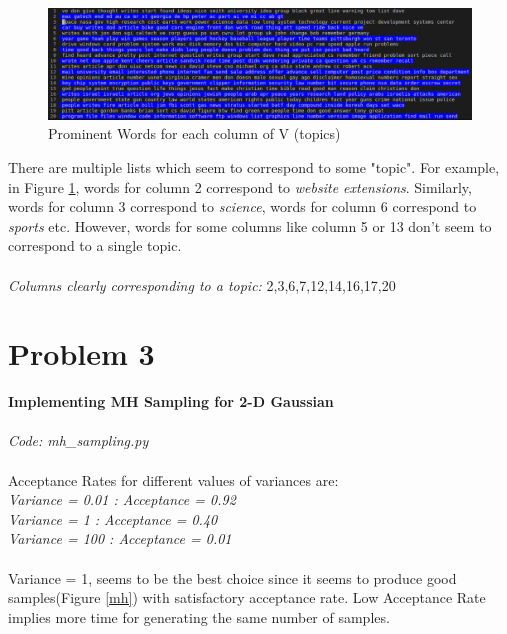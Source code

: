 \documentclass{article}
\begin{document}
\begin{figure}[h!]
\begin{center}
\includegraphics[scale=0.45]{topics.png}
\caption{Prominent Words for each column of V (topics)}
\label{topics}
\end{center}
\end{figure}

There are multiple lists which seem to correspond to some "topic". For example, in Figure \ref{topics}, words for column 2 correspond to \emph{website extensions}. Similarly, words for column 3 correspond to \emph{science}, words for column 6 correspond to \emph{sports} etc. However, words for some columns like column 5 or 13 don't seem to correspond to a single topic. \\ \\
\emph{Columns clearly corresponding to a topic: } 2,3,6,7,12,14,16,17,20

\section*{Problem 3}
\textbf{Implementing MH Sampling for 2-D Gaussian} \\ \\
\emph{Code: mh\_sampling.py} \\ \\
Acceptance Rates for different values of variances are: \\
\emph{Variance = 0.01 : Acceptance = 0.92} \\
\emph{Variance = 1 : Acceptance = 0.40}\\
\emph{Variance = 100 : Acceptance = 0.01} \\ \\
Variance = 1, seems to be the best choice since it seems to produce good samples(Figure \ref{mh}) with satisfactory acceptance rate. Low Acceptance Rate implies more time for generating the same number of samples.
\end{document}
